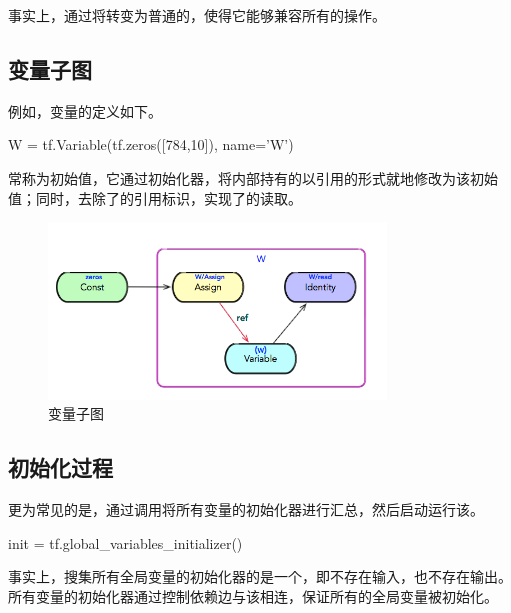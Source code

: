 \begin{content}
事实上，通过将转变为普通的，使得它能够兼容所有的操作。


\subsection{变量子图}

例如，变量的定义如下。

\begin{leftbar}
\begin{python}
W = tf.Variable(tf.zeros([784,10]), name='W')
\end{python}
\end{leftbar}

常称为初始值，它通过初始化器，将内部持有的以引用的形式就地修改为该初始值；同时，去除了的引用标识，实现了的读取。

\begin{figure}[!h]
\centering
\includegraphics[width=0.8\textwidth]{figures/variable-initialization-model.png}
\caption{变量子图}
 \label{fig:variable-initialization-model}
\end{figure}


\subsection{初始化过程}

更为常见的是，通过调用将所有变量的初始化器进行汇总，然后启动运行该。

\begin{leftbar}
\begin{python}
init = tf.global_variables_initializer()
\end{python}
\end{leftbar}

事实上，搜集所有全局变量的初始化器的是一个，即不存在输入，也不存在输出。所有变量的初始化器通过控制依赖边与该相连，保证所有的全局变量被初始化。


\end{content}
